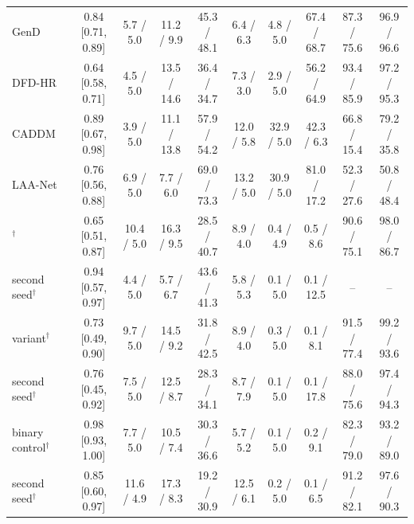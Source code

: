 \begin{tabular}{@{}l c cccccccc@{}}
GenD~\cite{gend2026} & 0.84 [0.71, 0.89] & 5.7 / 5.0 & 11.2 / 9.9 & 45.3 / 48.1 & 6.4 / 6.3 & 4.8 / 5.0 & 67.4 / 68.7 & 87.3 / 75.6 & 96.9 / 96.6 \\
DFD-HR~\cite{dfdhr2026} & 0.64 [0.58, 0.71] & 4.5 / 5.0 & 13.5 / 14.6 & 36.4 / 34.7 & 7.3 / 3.0 & 2.9 / 5.0 & 56.2 / 64.9 & 93.4 / 85.9 & 97.2 / 95.3 \\
CADDM~\cite{caddm} & 0.89 [0.67, 0.98] & 3.9 / 5.0 & 11.1 / 13.8 & 57.9 / 54.2 & 12.0 / 5.8 & 32.9 / 5.0 & 42.3 / 6.3 & 66.8 / 15.4 & 79.2 / 35.8 \\
LAA-Net~\cite{laanet} & 0.76 [0.56, 0.88] & 6.9 / 5.0 & 7.7 / 6.0 & 69.0 / 73.3 & 13.2 / 5.0 & 30.9 / 5.0 & 81.0 / 17.2 & 52.3 / 27.6 & 50.8 / 48.4 \\
\midrule
\ours{}$^\dagger$ & 0.65 [0.51, 0.87] & 10.4 / 5.0 & 16.3 / 9.5 & 28.5 / 40.7 & 8.9 / 4.0 & 0.4 / 4.9 & 0.5 / 8.6 & 90.6 / 75.1 & 98.0 / 86.7 \\
\quad second seed$^\dagger$ & 0.94 [0.57, 0.97] & 4.4 / 5.0 & 5.7 / 6.7 & 43.6 / 41.3 & 5.8 / 5.3 & 0.1 / 5.0 & 0.1 / 12.5 & -- & -- \\
\ours{} variant$^\dagger$ & 0.73 [0.49, 0.90] & 9.7 / 5.0 & 14.5 / 9.2 & 31.8 / 42.5 & 8.9 / 4.0 & 0.3 / 5.0 & 0.1 / 8.1 & 91.5 / 77.4 & 99.2 / 93.6 \\
\quad second seed$^\dagger$ & 0.76 [0.45, 0.92] & 7.5 / 5.0 & 12.5 / 8.7 & 28.3 / 34.1 & 8.7 / 7.9 & 0.1 / 5.0 & 0.1 / 17.8 & 88.0 / 75.6 & 97.4 / 94.3 \\
binary control$^\dagger$ & 0.98 [0.93, 1.00] & 7.7 / 5.0 & 10.5 / 7.4 & 30.3 / 36.6 & 5.7 / 5.2 & 0.1 / 5.0 & 0.2 / 9.1 & 82.3 / 79.0 & 93.2 / 89.0 \\
\quad second seed$^\dagger$ & 0.85 [0.60, 0.97] & 11.6 / 4.9 & 17.3 / 8.3 & 19.2 / 30.9 & 12.5 / 6.1 & 0.2 / 5.0 & 0.1 / 6.5 & 91.2 / 82.1 & 97.6 / 90.3 \\
\bottomrule
\end{tabular}
